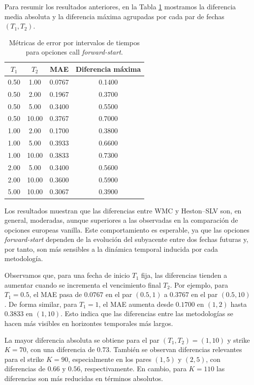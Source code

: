 Para resumir los resultados anteriores, en la Tabla
\ref{tab:comparacion_forward_start_call_metricas} mostramos la diferencia media
absoluta y la diferencia máxima agrupadas por cada par de fechas \((T_1,T_2)\).

\begin{table}[H]
\centering
\begin{tabular}{|c|c|c|c|}
\hline
\(T_1\) & \(T_2\) & MAE & Diferencia máxima \\
\hline
0.50 & 1.00  & 0.0767 & 0.1400 \\
0.50 & 2.00  & 0.1967 & 0.3700 \\
0.50 & 5.00  & 0.3400 & 0.5500 \\
0.50 & 10.00 & 0.3767 & 0.7000 \\
1.00 & 2.00  & 0.1700 & 0.3800 \\
1.00 & 5.00  & 0.3933 & 0.6600 \\
1.00 & 10.00 & 0.3833 & 0.7300 \\
2.00 & 5.00  & 0.3400 & 0.5600 \\
2.00 & 10.00 & 0.3600 & 0.5900 \\
5.00 & 10.00 & 0.3067 & 0.3900 \\
\hline
\end{tabular}
\caption{Métricas de error por intervalos de tiempos para opciones call \textit{forward-start}.}
\label{tab:comparacion_forward_start_call_metricas}
\end{table}

Los resultados muestran que las diferencias entre WMC y Heston--SLV son, en
general, moderadas, aunque superiores a las observadas en la comparación de
opciones europeas vanilla. Este comportamiento es esperable, ya que las opciones
\textit{forward-start} dependen de la evolución del subyacente entre dos fechas futuras y,
por tanto, son más sensibles a la dinámica temporal inducida por cada metodología.\medskip

Observamos que, para una fecha de inicio $T_1$ fija, las diferencias tienden a aumentar
cuando se incrementa el vencimiento final $T_2$. Por ejemplo, para $T_1=0.5$,
el MAE pasa de $0.0767$ en el par $(0.5,1)$ a $0.3767$ en el par
$(0.5,10)$. De forma similar, para $T_1=1$, el MAE aumenta desde $0.1700$
en $(1,2)$ hasta $0.3833$ en $(1,10)$. Esto indica que las diferencias entre
las metodologías se hacen más visibles en horizontes temporales más largos.\medskip

La mayor diferencia absoluta se obtiene para el par \((T_1,T_2)=(1,10)\) y strike
$K=70$, con una diferencia de $0.73$. También se observan diferencias relevantes
para el strike $K = 90$, especialmente en los pares $(1,5) \text{ y } (2,5)$, con diferencias
de $0.66 \text{ y } 0.56$, respectivamente. En cambio, para $K=110$ las diferencias
son más reducidas en términos absolutos.\medskip

